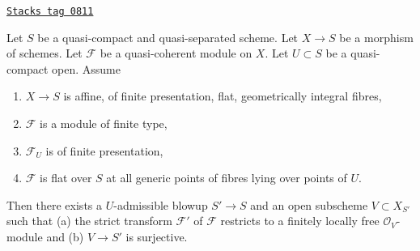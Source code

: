 \begin{lemma}
\label{flat-lemma-flatten-module-pre}
\href{https://stacks.math.columbia.edu/tag/0811}{\texttt{Stacks tag 0811}}

Let $S$ be a quasi-compact and quasi-separated scheme.
Let $X \to S$ be a morphism of schemes.
Let $\mathcal{F}$ be a quasi-coherent module on $X$.
Let $U \subset S$ be a quasi-compact open. Assume
\begin{enumerate}
\item $X \to S$ is affine, of finite presentation, flat,
geometrically integral fibres,
\item $\mathcal{F}$ is a module of finite type,
\item $\mathcal{F}_U$ is of finite presentation,
\item $\mathcal{F}$ is flat over $S$ at all generic points of
fibres lying over points of $U$.
\end{enumerate}
Then there exists a $U$-admissible blowup $S' \to S$
and an open subscheme $V \subset X_{S'}$
such that (a) the strict transform $\mathcal{F}'$ of $\mathcal{F}$
restricts to a finitely locally free $\mathcal{O}_V$-module and
(b) $V \to S'$ is surjective.
\end{lemma}


